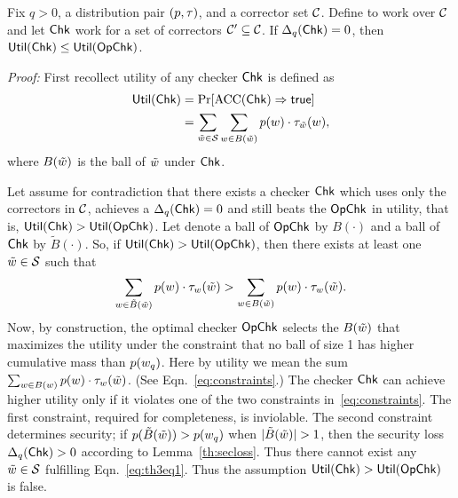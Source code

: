 \setcounter{theorem}{1}
\begin{theorem} Fix $q > 0$, a distribution pair
  $(p,\tau)$, and a corrector set ${\mathcal C}$. Define
  \opchecker to work over ${\mathcal C}$ and let $\textnormal{\textsf{Chk}}$ work for a set
  of correctors ${\mathcal C}' \subseteq {\mathcal C}$. If
  $\Delta_q(\textnormal{\textsf{Chk}}) = 0$, then
  $\textnormal{\textsf{Util}}(\textnormal{\textsf{Chk}}) \le \textnormal{\textsf{Util}}(\textnormal{\textsf{OpChk}})$.
\end{theorem}
\def\Bt{\tilde{B}}
\noindent\emph{Proof:} 
First recollect utility of any checker $\textnormal{\textsf{Chk}}$ is defined as
\begin{align*}\label{eq:th3eq1}
\utility(\checker) &= \Pr[\ACC(\checker)\Rightarrow \true]\\
  & = \sum_{\pwtypo\in\strings}\sum_{\pw\in\ball(\pwtypo)}\pwprob(\pw)\cdot\typoprob_{\pwtypo}(\pw),
\end{align*}
where $B(\tilde{w})$ is the ball of $\tilde{w}$ under $\textnormal{\textsf{Chk}}$.

Let assume for contradiction that there exists a checker $\textnormal{\textsf{Chk}}$
which uses only the correctors in ${\mathcal C}$, achieves a
$\Delta_q(\textnormal{\textsf{Chk}})=0$ and still beats the $\textnormal{\textsf{OpChk}}$ in utility,
that is, $\textnormal{\textsf{Util}}(\textnormal{\textsf{Chk}})>\textnormal{\textsf{Util}}(\textnormal{\textsf{OpChk}})$. Let denote a ball
of $\textnormal{\textsf{OpChk}}$ by $B(\cdot)$ and a ball of $\textnormal{\textsf{Chk}}$ by
$\Bt(\cdot)$.  So, if $\textnormal{\textsf{Util}}(\textnormal{\textsf{Chk}})>\textnormal{\textsf{Util}}(\textnormal{\textsf{OpChk}})$, then
there exists at least one $\tilde{w}\in\mathcal{S}$ such that
\begin{equation}
  \label{eq:th3eq1}
  \sum_{\pw\in \Bt(\pwtypo)}\pwprob(\pw)\cdot\typoprob_{\pw}(\pwtypo) >\sum_{\pw\in B(\pwtypo)}\pwprob(\pw)\cdot\typoprob_{\pw}(\pwtypo).
\end{equation}
Now, by construction, the optimal checker $\textnormal{\textsf{OpChk}}$ selects the
$B(\tilde{w})$ that maximizes the utility under the constraint that
no ball of size 1 has higher cumulative mass than $p({w}_q)$.
Here by utility we mean the sum
$\sum_{{w}\in B({w})}p({w})\cdot\tau_{{w}}(\tilde{w})$. (See
Eqn.~\ref{eq:constraints}.)  The checker $\textnormal{\textsf{Chk}}$ can achieve higher
utility only if it violates one of the two constraints
in~\eqref{eq:constraints}.  The first constraint, required for
completeness, is inviolable.  The second constraint determines
security; if $\pwprob(\Bt(\pwtypo))>\pwprob(\pw_q)$ when
$|\Bt(\pwtypo)|>1$, then the security loss $\Delta_q(\textnormal{\textsf{Chk}})>0$
according to Lemma~\ref{th:secloss}. Thus there cannot exist any
$\tilde{w}\in\mathcal{S}$ fulfilling Eqn.~\ref{eq:th3eq1}. Thus
the assumption $\textnormal{\textsf{Util}}(\textnormal{\textsf{Chk}})>\textnormal{\textsf{Util}}(\textnormal{\textsf{OpChk}})$ is false.
\qedsym


